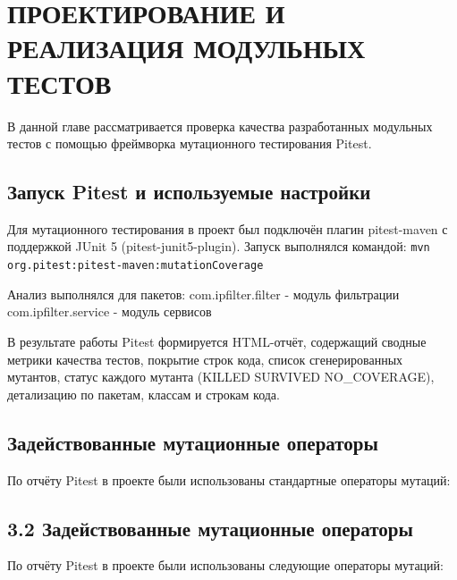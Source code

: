 \chapter{ПРОЕКТИРОВАНИЕ И РЕАЛИЗАЦИЯ МОДУЛЬНЫХ ТЕСТОВ} \label{ch3}


В данной главе рассматривается проверка качества разработанных модульных тестов с помощью фреймворка мутационного тестирования Pitest.


\section{Запуск Pitest и используемые настройки} \label{ch3:sec1}

Для мутационного тестирования в проект был подключён плагин pitest-maven с поддержкой JUnit 5 (pitest-junit5-plugin).
Запуск выполнялся командой:
\texttt{mvn org.pitest:pitest-maven:mutationCoverage}

Анализ выполнялся для пакетов:
com.ipfilter.filter - модуль фильтрации
com.ipfilter.service - модуль сервисов

В результате работы Pitest формируется HTML-отчёт, содержащий сводные метрики качества тестов, покрытие строк кода, список сгенерированных мутантов, статус каждого мутанта (KILLED \/ SURVIVED \/ NO\_COVERAGE), детализацию по пакетам, классам и строкам кода.

\section{Задействованные мутационные операторы}\label{ch3:sec2}
По отчёту Pitest в проекте были использованы стандартные операторы мутаций:

\section{3.2 Задействованные мутационные операторы}

По отчёту Pitest в проекте были использованы следующие операторы мутаций:

